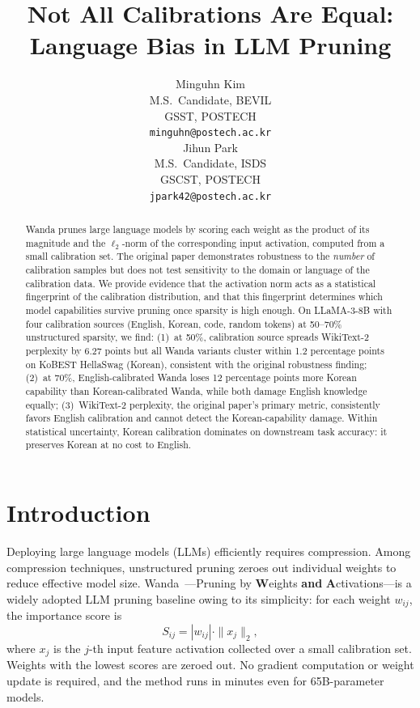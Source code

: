 \documentclass{article}
\title{Not All Calibrations Are Equal:\\Language Bias in LLM Pruning}
\author{%
  Minguhn Kim \\
  M.S.\ Candidate, BEVIL\\
  GSST, POSTECH\\
  \texttt{minguhn@postech.ac.kr} \\
  \And
  Jihun Park \\
  M.S.\ Candidate, ISDS\\
  GSCST, POSTECH\\
  \texttt{jpark42@postech.ac.kr} \\
}
\begin{document}
\maketitle

\begin{abstract}
Wanda prunes large language models by scoring each weight as the product of its magnitude and the $\ell_2$-norm of the corresponding input activation, computed from a small calibration set.
The original paper demonstrates robustness to the \emph{number} of calibration samples but does not test sensitivity to the domain or language of the calibration data.
We provide evidence that the activation norm acts as a statistical fingerprint of the calibration distribution, and that this fingerprint determines which model capabilities survive pruning once sparsity is high enough.
On LLaMA-3-8B with four calibration sources (English, Korean, code, random tokens) at 50--70\% unstructured sparsity, we find: (1)~at 50\%, calibration source spreads WikiText-2 perplexity by 6.27 points but all Wanda variants cluster within 1.2 percentage points on KoBEST HellaSwag (Korean), consistent with the original robustness finding; (2)~at 70\%, English-calibrated Wanda loses 12 percentage points more Korean capability than Korean-calibrated Wanda, while both damage English knowledge equally; (3)~WikiText-2 perplexity, the original paper's primary metric, consistently favors English calibration and cannot detect the Korean-capability damage.
Within statistical uncertainty, Korean calibration dominates on downstream task accuracy: it preserves Korean at no cost to English.
\end{abstract}

\section{Introduction}

Deploying large language models (LLMs) efficiently requires compression.
Among compression techniques, unstructured pruning zeroes out individual weights to reduce effective model size.
Wanda~\citep{sun2024wanda}---Pruning by \textbf{W}eights \textbf{and} \textbf{A}ctivations---is a widely adopted LLM pruning baseline owing to its simplicity: for each weight $w_{ij}$, the importance score is
\begin{equation}
  S_{ij} = |w_{ij}| \cdot \|x_j\|_2,
  \label{eq:wanda}
\end{equation}
where $x_j$ is the $j$-th input feature activation collected over a small calibration set.
Weights with the lowest scores are zeroed out.
No gradient computation or weight update is required, and the method runs in minutes even for 65B-parameter models.
\end{document}
